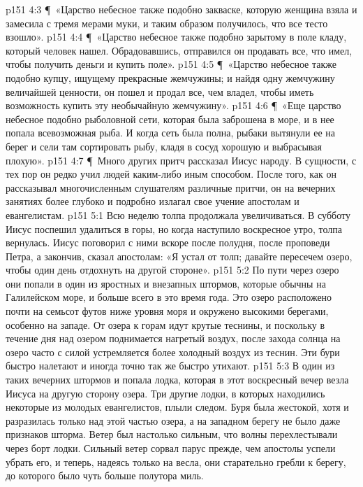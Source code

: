 \vs p151 4:3 \P\ «Царство небесное также подобно закваске, которую женщина взяла и замесила с тремя мерами муки, и таким образом получилось, что все тесто взошло».
\vs p151 4:4 \P\ «Царство небесное также подобно зарытому в поле кладу, который человек нашел. Обрадовавшись, отправился он продавать все, что имел, чтобы получить деньги и купить поле».
\vs p151 4:5 \P\ «Царство небесное также подобно купцу, ищущему прекрасные жемчужины; и найдя одну жемчужину величайшей ценности, он пошел и продал все, чем владел, чтобы иметь возможность купить эту необычайную жемчужину».
\vs p151 4:6 \P\ «Еще царство небесное подобно рыболовной сети, которая была заброшена в море, и в нее попала всевозможная рыба. И когда сеть была полна, рыбаки вытянули ее на берег и сели там сортировать рыбу, кладя в сосуд хорошую и выбрасывая плохую».
\vs p151 4:7 \P\ Много других притч рассказал Иисус народу. В сущности, с тех пор он редко учил людей каким\hyp{}либо иным способом. После того, как он рассказывал многочисленным слушателям различные притчи, он на вечерних занятиях более глубоко и подробно излагал свое учение апостолам и евангелистам.
\vs p151 5:1 Всю неделю толпа продолжала увеличиваться. В субботу Иисус поспешил удалиться в горы, но когда наступило воскресное утро, толпа вернулась. Иисус поговорил с ними вскоре после полудня, после проповеди Петра, а закончив, сказал апостолам: «Я устал от толп; давайте пересечем озеро, чтобы один день отдохнуть на другой стороне».
\vs p151 5:2 По пути через озеро они попали в один из яростных и внезапных штормов, которые обычны на Галилейском море, и больше всего в это время года. Это озеро расположено почти на семьсот футов ниже уровня моря и окружено высокими берегами, особенно на западе. От озера к горам идут крутые теснины, и поскольку в течение дня над озером поднимается нагретый воздух, после захода солнца на озеро часто с силой устремляется более холодный воздух из теснин. Эти бури быстро налетают и иногда точно так же быстро утихают.
\vs p151 5:3 В один из таких вечерних штормов и попала лодка, которая в этот воскресный вечер везла Иисуса на другую сторону озера. Три другие лодки, в которых находились некоторые из молодых евангелистов, плыли следом. Буря была жестокой, хотя и разразилась только над этой частью озера, а на западном берегу не было даже признаков шторма. Ветер был настолько сильным, что волны перехлестывали через борт лодки. Сильный ветер сорвал парус прежде, чем апостолы успели убрать его, и теперь, надеясь только на весла, они старательно гребли к берегу, до которого было чуть больше полутора миль.
